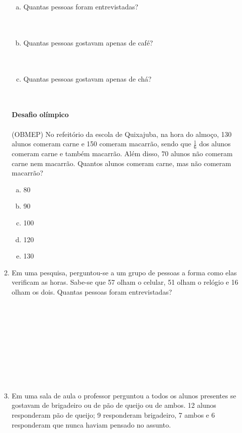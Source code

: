 \documentclass[a4paper,14pt]{article}
\begin{document}
\begin{multicols}{2}
\begin{enumerate}
\begin{enumerate}[a)]
    		\item Quantas pessoas foram entrevistadas? \\\\\\
    		\item Quantas pessoas gostavam apenas de café? \\\\\\
    		\item Quantas pessoas gostavam apenas de chá? \\\\\\
    	\end{enumerate}
    	\textbf{Desafio olímpico} \\\\
    	(OBMEP) No refeitório da escola de Quixajuba, na hora do almoço, 130 alunos comeram carne e 150 comeram macarrão, sendo que $\frac{1}{6}$ dos alunos comeram carne e também macarrão. Além disso, 70 alunos não comeram carne nem macarrão. Quantos alunos comeram carne, mas não comeram macarrão? \\
    	\begin{enumerate}[a)]
    		\item 80 \\
    		\item 90 \\
    		\item 100 \\
    		\item 120 \\
    		\item 130 \\ \newpage
    	\end{enumerate}
    	\item Em uma pesquisa, perguntou-se a um grupo de pessoas a forma como elas verificam as horas. Sabe-se que 57 olham o celular, 51 olham o relógio e 16 olham os dois. Quantas pessoas foram entrevistadas? \\\\\\\\\\\\\\\\\\\\
    	\item Em uma sala de aula o professor perguntou a todos os alunos presentes se gostavam de brigadeiro ou de pão de queijo ou de ambos. 12 alunos responderam pão de queijo; 9 responderam brigadeiro, 7 ambos e 6 responderam que nunca haviam pensado no assunto.

\end{enumerate}
\end{multicols}
\end{document}
